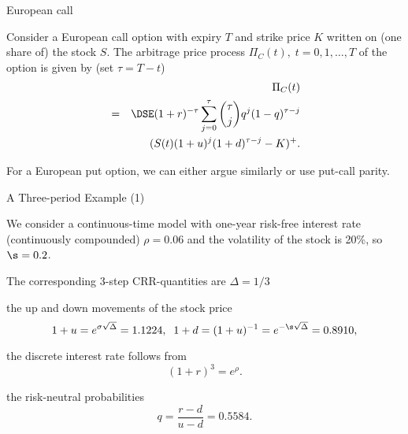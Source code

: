 {European call}
  \item Consider a European call option with expiry $T$ and strike price
$K$ written on (one share of) the stock $S$. The arbitrage price
process $\Pi_C(t), \; t=0, 1, \ldots, T$ of the option is given by
(set $\tau=T-t$)
\begin{eqnarray}\label{crrcallprice}
&& \Pi_C(t)\\\nonumber
&=&\DSE (1+r)^{-\tau} \sum_{j=0}^{\tau} {{\tau} \choose j}
{q}^j (1 - q)^{\tau-j}\\\nonumber
&&(S(t) (1+u)^j (1+d)^{\tau-j} - K)^+.
\end{eqnarray}
\item For a European put option, we can either argue similarly or use
put-call parity.

{ A Three-period Example (1)}

  \item<1->  We consider a continuous-time model with one-year risk-free interest rate (continuously compounded) $\rho=0.06$ and the volatility of the stock is 20\%, so $\s = 0.2$.
  \item<2-> The corresponding 3-step CRR-quantities are $\Delta =1/3$
  \item
the up and down movements of the stock price
$$
1+u=e^{\sigma \sqrt{\Delta}} = 1.1224, \; \;
1+d =
(1+u)^{-1} = e^{-\s \sqrt{\Delta}} = 0.8910,
$$
 \item  the discrete interest rate follows from
$$
(1+r)^3= e^\rho.
$$
 \item  the risk-neutral
probabilities
$$
q=\frac{r-d}{u-d}= 0.5584.
$$


